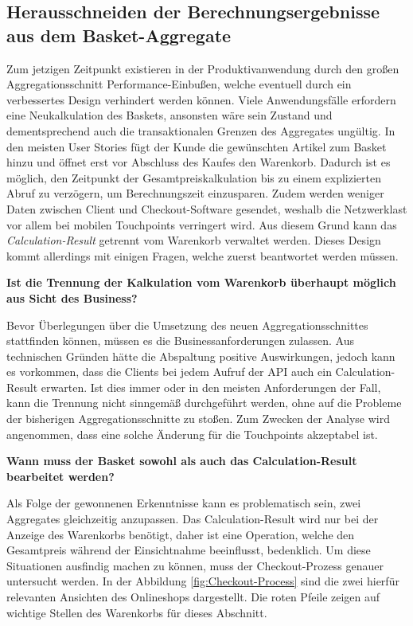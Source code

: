 \subsection{Herausschneiden der Berechnungsergebnisse aus dem Basket-Aggregate}

Zum jetzigen Zeitpunkt existieren in der Produktivanwendung durch den großen Aggregationsschnitt Performance-Einbußen, welche eventuell durch ein verbessertes Design verhindert werden können. Viele Anwendungsfälle erfordern eine Neukalkulation des Baskets, ansonsten wäre sein Zustand und dementsprechend auch die transaktionalen Grenzen des Aggregates ungültig. In den meisten User Stories fügt der Kunde die gewünschten Artikel zum Basket hinzu und öffnet erst vor Abschluss des Kaufes den Warenkorb. Dadurch ist es möglich, den Zeitpunkt der Gesamtpreiskalkulation bis zu einem explizierten Abruf zu verzögern, um Berechnungszeit einzusparen. Zudem werden weniger Daten zwischen Client und Checkout-Software gesendet, weshalb die Netzwerklast vor allem bei mobilen Touchpoints verringert wird. Aus diesem Grund kann das \emph{Calculation-Result} getrennt vom Warenkorb verwaltet werden. Dieses Design kommt allerdings mit einigen Fragen, welche zuerst beantwortet werden müssen.

\textbf{Ist die Trennung der Kalkulation vom Warenkorb überhaupt möglich aus Sicht des Business?}

Bevor Überlegungen über die Umsetzung des neuen Aggregationsschnittes stattfinden können, müssen es die Businessanforderungen zulassen. Aus technischen Gründen hätte die Abspaltung positive Auswirkungen, jedoch kann es vorkommen, dass die Clients bei jedem Aufruf der API auch ein Calculation-Result erwarten. Ist dies immer oder in den meisten Anforderungen der Fall, kann die Trennung nicht sinngemäß durchgeführt werden, ohne auf die Probleme der bisherigen Aggregationsschnitte zu stoßen. Zum Zwecken der Analyse wird angenommen, dass eine solche Änderung für die Touchpoints akzeptabel ist.

\textbf{Wann muss der Basket sowohl als auch das Calculation-Result bearbeitet werden?}

Als Folge der gewonnenen Erkenntnisse kann es problematisch sein, zwei Aggregates gleichzeitig anzupassen. Das Calculation-Result wird nur bei der Anzeige des Warenkorbs benötigt, daher ist eine Operation, welche den Gesamtpreis während der Einsichtnahme beeinflusst, bedenklich. Um diese Situationen ausfindig machen zu können, muss der Checkout-Prozess genauer untersucht werden. In der Abbildung \ref{fig:Checkout-Process} sind die zwei hierfür relevanten Ansichten des Onlineshops dargestellt. Die roten Pfeile zeigen auf wichtige Stellen des Warenkorbs für dieses Abschnitt.

